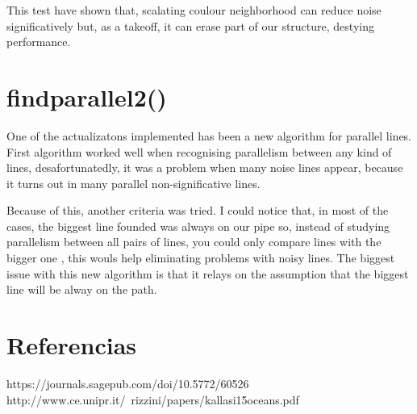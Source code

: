 \documentclass[12pt, a4paper]{article}
\begin{document}
This test have shown that, scalating coulour neighborhood can reduce noise significatively 
but, as a takeoff, it can erase part of our structure, destying performance.


\section{findparallel2()}

One of the actualizatons implemented has been a new algorithm for parallel lines. 
First algorithm worked well when recognising parallelism between any kind of lines, 
desafortunatedly, it was a problem when many noise lines appear, because it turns out in 
many parallel non-significative lines.

Because of this, another criteria was tried. I could notice that, in most of the cases, 
the biggest line founded was always on our pipe so, instead of studying parallelism between all
pairs of lines, you could only compare lines with the bigger one , this wouls help eliminating problems
with noisy lines. The biggest issue with this new algorithm is that it relays on the assumption that the 
biggest line will be alway on the path.

\section{Referencias}

https://journals.sagepub.com/doi/10.5772/60526
http://www.ce.unipr.it/~rizzini/papers/kallasi15oceans.pdf
\end{document}
